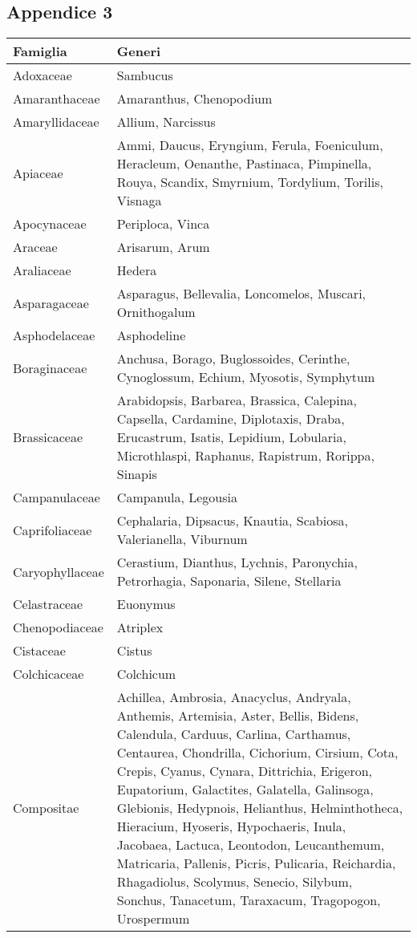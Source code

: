 \documentclass[main.tex]{subfiles}
\begin{document}
\subsection{Appendice 3}

\begin{table}[!ht]
    \centering
    \begin{tabular}[\footnotesize]{|p{3cm}|p{9cm}|}
    \hline
        \textbf{Famiglia} & \textbf{Generi} \\ \hline
        Adoxaceae & Sambucus \\ \hline
        Amaranthaceae & Amaranthus, Chenopodium \\ \hline
        Amaryllidaceae & Allium, Narcissus \\ \hline
        Apiaceae & Ammi, Daucus, Eryngium, Ferula, Foeniculum, Heracleum, Oenanthe, Pastinaca, Pimpinella, Rouya, Scandix, Smyrnium, Tordylium, Torilis, Visnaga \\ \hline
        Apocynaceae & Periploca, Vinca \\ \hline
        Araceae  & Arisarum, Arum \\ \hline
        Araliaceae & Hedera \\ \hline
        Asparagaceae & Asparagus, Bellevalia, Loncomelos, Muscari, Ornithogalum \\ \hline
        Asphodelaceae & Asphodeline \\ \hline
        Boraginaceae & Anchusa, Borago, Buglossoides, Cerinthe, Cynoglossum, Echium, Myosotis, Symphytum \\ \hline
        Brassicaceae & Arabidopsis, Barbarea, Brassica, Calepina, Capsella, Cardamine, Diplotaxis, Draba, Erucastrum, Isatis, Lepidium, Lobularia, Microthlaspi, Raphanus, Rapistrum, Rorippa, Sinapis \\ \hline
        Campanulaceae & Campanula, Legousia \\ \hline
        Caprifoliaceae & Cephalaria, Dipsacus, Knautia, Scabiosa, Valerianella, Viburnum \\ \hline
        Caryophyllaceae & Cerastium, Dianthus, Lychnis, Paronychia, Petrorhagia, Saponaria, Silene, Stellaria \\ \hline
        Celastraceae & Euonymus \\ \hline
        Chenopodiaceae & Atriplex \\ \hline
        Cistaceae & Cistus \\ \hline
        Colchicaceae & Colchicum \\ \hline
        Compositae & Achillea, Ambrosia, Anacyclus, Andryala, Anthemis, Artemisia, Aster, Bellis, Bidens, Calendula, Carduus, Carlina, Carthamus, Centaurea, Chondrilla, Cichorium, Cirsium, Cota, Crepis, Cyanus, Cynara, Dittrichia, Erigeron, Eupatorium, Galactites, Galatella, Galinsoga, Glebionis, Hedypnois, Helianthus, Helminthotheca, Hieracium, Hyoseris, Hypochaeris, Inula, Jacobaea, Lactuca, Leontodon, Leucanthemum, Matricaria, Pallenis, Picris, Pulicaria, Reichardia, Rhagadiolus, Scolymus, Senecio, Silybum, Sonchus, Tanacetum, Taraxacum, Tragopogon, Urospermum \\ \hline

\end{tabular}
\end{table}
\end{document}
